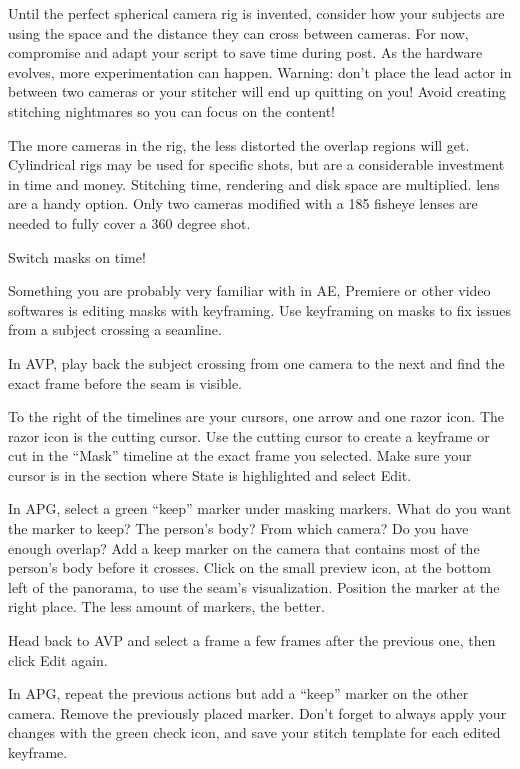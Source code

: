 \begin{fullwidth}
Until the perfect spherical camera rig is invented, consider how your subjects are using the space and the distance they can cross between cameras. For now, compromise and adapt your script to save time during post. As the hardware evolves, more experimentation can happen. Warning: don’t place the lead actor in between two cameras or your stitcher will end up quitting on you! Avoid creating stitching nightmares so you can focus on the content!

The more cameras in the rig, the less distorted the overlap regions will get. Cylindrical rigs may be used for specific shots, but are a considerable investment in time and money. Stitching time, rendering and disk space are multiplied. \textbf{} lens are a handy option. Only two cameras modified with a 185 fisheye lenses are needed to fully cover a 360 degree shot.

{\large Switch masks on time! \par}

Something you are probably very familiar with in AE, Premiere or other video softwares is editing masks with keyframing. Use keyframing on masks to fix issues from a subject crossing a seamline. 

In AVP, play back the subject crossing from one camera to the next and find the exact frame before the seam is visible. 

To the right of the timelines are your cursors, one arrow and one razor icon. The razor icon is the cutting cursor. Use the cutting cursor to create a keyframe or cut in the “Mask” timeline at the exact frame you selected. Make sure your cursor is in the section where State is highlighted and select Edit.


In APG, select a green “keep” marker under masking markers. What do you want the marker to keep? The person’s body? From which camera? Do you have enough overlap? Add a keep marker on the camera that contains most of the person’s body before it crosses. Click on the small preview icon, at the bottom left of the panorama, to use the seam’s visualization. Position the marker at the right place. The less amount of markers, the better.


Head back to AVP and select a frame a few frames after the previous one, then click Edit again. 


In APG, repeat the previous actions but add a “keep” marker on the other camera. Remove the previously placed marker. Don’t forget to always apply your changes with the green check icon, and save your stitch template for each edited keyframe.


\end{fullwidth}
